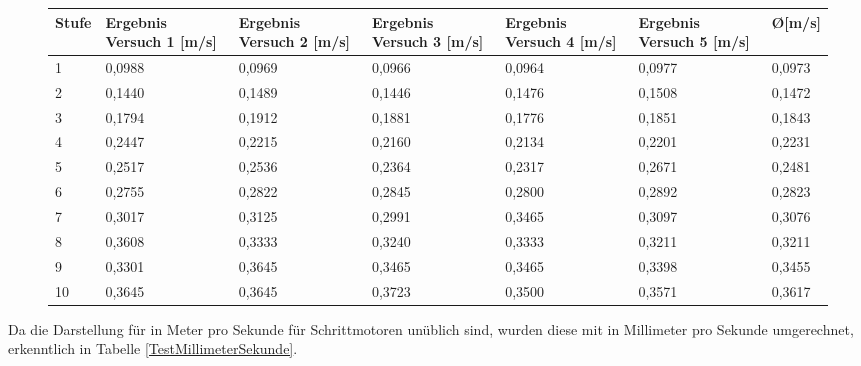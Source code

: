 \begin{figure}[H]
	\begin{center}
		\fontsize{8}{10}\selectfont
		\begin{tabularx}{\linewidth}{|p{0.8cm}|X|X|X|X|X|X|}
			\hline 
			\textbf{Stufe} & \textbf{Ergebnis Versuch 1 [m/s]} & \textbf{Ergebnis Versuch 2 [m/s]} & \textbf{Ergebnis Versuch 3 [m/s]}& \textbf{Ergebnis Versuch 4 [m/s]} & \textbf{Ergebnis Versuch 5 [m/s]} & \textbf{\O [m/s]}\\ \hline
			
			1 & 0,0988 & 0,0969 & 0,0966 & 0,0964 & 0,0977 & 0,0973 \\ \hline
			2 & 0,1440 & 0,1489 & 0,1446 & 0,1476 & 0,1508 & 0,1472 \\ \hline
			3 & 0,1794 & 0,1912 & 0,1881 & 0,1776 & 0,1851 & 0,1843 \\ \hline
			4 & 0,2447 & 0,2215 & 0,2160 & 0,2134 & 0,2201 & 0,2231 \\ \hline
			5 & 0,2517 & 0,2536 & 0,2364 & 0,2317 & 0,2671 & 0,2481\\ \hline
			6 & 0,2755 & 0,2822 & 0,2845 & 0,2800 & 0,2892 & 0,2823 \\ \hline
			7 & 0,3017 & 0,3125 & 0,2991 & 0,3465 & 0,3097 & 0,3076 \\ \hline
			8 & 0,3608 & 0,3333 & 0,3240 & 0,3333 & 0,3211 & 0,3211 \\ \hline
			9 & 0,3301 & 0,3645 & 0,3465 & 0,3465 & 0,3398 & 0,3455 \\ \hline
			10 & 0,3645 & 0,3645 & 0,3723 & 0,3500 & 0,3571  & 0,3617 \\ \hline
			
		\end{tabularx}		
		\label{TestMeterSekunde}
	\end{center}
\end{figure}

Da die Darstellung für in Meter pro Sekunde für Schrittmotoren unüblich sind, wurden diese mit in Millimeter pro Sekunde umgerechnet, erkenntlich in Tabelle \ref{TestMillimeterSekunde}. 

